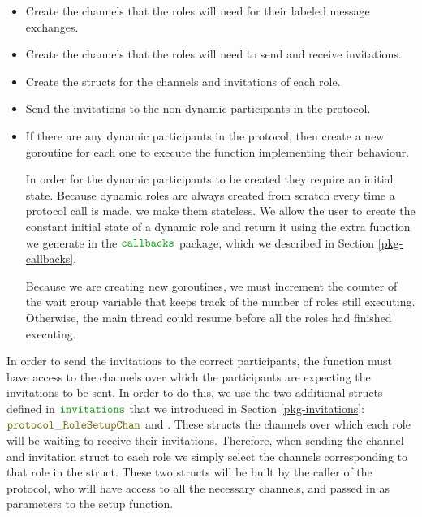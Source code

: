 \documentclass[12pt,twoside]{report}
\begin{document}
\begin{itemize}
    \item Create the channels that the roles will need for their labeled message exchanges.
    \item Create the channels that the roles will need to send and receive invitations.
    \item Create the structs for the channels and invitations of each role.
    \item Send the invitations to the non-dynamic participants in the protocol.
    \item If there are any dynamic participants in the protocol, then create a new goroutine for each one to execute the function implementing their behaviour.
    
    In order for the dynamic participants to be created they require an initial state. Because dynamic roles are always created from scratch every time a protocol call is made, we make them stateless. We allow the user to create the constant initial state of a dynamic role and return it using the extra function we generate in the $\pkgname{callbacks}$ package, which we described in Section \ref{pkg-callbacks}.

    Because we are creating new goroutines, we must increment the counter of the wait group variable that keeps track of the number of roles still executing. Otherwise, the main thread could resume before all the roles had finished executing.
\end{itemize}

In order to send the invitations to the correct participants, the function must have access to the channels over which the participants are expecting the invitations to be sent. In order to do this, we use the two additional structs defined in $\pkgname{invitations}$ that we introduced in Section \ref{pkg-invitations}: $\structname{protocol\_RoleSetupChan}$ and {\color{dkyellow} \texttt{}}. These structs the channels over which each role will be waiting to receive their invitations. Therefore, when sending the channel and invitation struct to each role we simply select the channels corresponding to that role in the struct. These two structs will be built by the caller of the protocol, who will have access to all the necessary channels, and passed in as parameters to the setup function.
\end{document}
